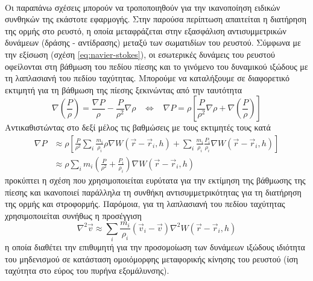 \paragraph{} Οι παραπάνω σχέσεις μπορούν να τροποποιηθούν για την ικανοποίηση ειδικών
συνθηκών της εκάστοτε εφαρμογής. Στην παρούσα περίπτωση απαιτείται η διατήρηση της ορμής
στο ρευστό, η οποία μεταφράζεται στην εξασφάλιση αντισυμμετρικών δυνάμεων (δράσης -
αντίδρασης) μεταξύ των σωματιδίων του ρευστού. Σύμφωνα με την εξίσωση 
(σχέση \ref{eq:navier-stokes}), οι εσωτερικές δυνάμεις του ρευστού οφείλονται στη βάθμωση
του πεδίου πίεσης και το γινόμενο του δυναμικού ιξώδους με τη λαπλασιανή του πεδίου
ταχύτητας. Μπορούμε να καταλήξουμε σε διαφορετικό εκτιμητή για τη βάθμωση της πίεσης
ξεκινώντας από την ταυτότητα
\begin{equation*}
  \label{eq:grad-identity}
  \nabla \left( \frac{P}{\rho} \right) =
  \frac{\nabla P}{\rho}-
  \frac{P}{\rho^2} \nabla \rho
  \hspace{10pt} \Leftrightarrow \hspace{10pt}
  \nabla P = \rho \left[ \frac{P}{\rho^2} \nabla \rho + \nabla \left( \frac{P}{\rho}
    \right) \right]
\end{equation*}
Αντικαθιστώντας στο δεξί μέλος τις βαθμώσεις με τους εκτιμητές τους κατά 
\begin{align}
  \label{eq:grad-est}
  \nabla P &\approx \rho \left[ \frac{P}{\rho^2} \sum_i \frac{m_i}{\rho_i} \rho \nabla
             W(\vec{r}-\vec{r}_i, h)
             +
             \sum_i \frac{m_i}{\rho_i} \frac{P_i}{\rho_i} \nabla W(\vec{r}-\vec{r}_i, h)
             \right] \nonumber \\
           &\approx\rho \sum_i m_i \left(\frac{P}{\rho^2} + \frac{P_i}{\rho_i} \right)
             \nabla W(\vec{r}-\vec{r}_i, h)
\end{align}
προκύπτει η σχέση που χρησιμοποιείται ευρύτατα για την εκτίμηση της βάθμωσης της πίεσης
και ικανοποιεί παράλληλα τη συνθήκη αντισυμμετρικότητας για τη διατήρηση της ορμής και
στροφορμής. Παρόμοια, για τη λαπλασιανή του πεδίου ταχύτητας χρησιμοποιείται συνήθως η
προσέγγιση
\begin{equation}
  \label{eq:lapl-est}
  \nabla^2\vec{v} \approx \sum_i \frac{m_i}{\rho_i} (\vec{v}_i - \vec{v}) \nabla^2
  W(\vec{r}-\vec{r}_i, h)
\end{equation}
η οποία διαθέτει την επιθυμητή για την προσομοίωση των δυνάμεων ιξώδους ιδιότητα του
μηδενισμού σε κατάσταση ομοιόμορφης μεταφορικής κίνησης του ρευστού (ίση ταχύτητα στο
εύρος του πυρήνα εξομάλυνσης).

